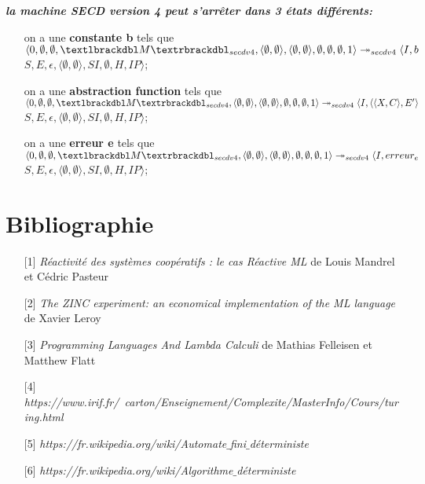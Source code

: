 \documentclass[10pt,a4paper]{article}
\begin{document}
			
			\textbf{\textit{la machine SECD version 4 peut s'arrêter dans 3 états différents:}}
			\smallbreak
			\begin{itemize}
				\item[] on a une \textbf{constante b} tels que $\langle 0,\emptyset,\emptyset,\textlbrackdbl M\textrbrackdbl_{secdv4},\langle\emptyset,\emptyset\rangle,\langle\emptyset,\emptyset\rangle,\emptyset,\emptyset,\emptyset,1\rangle \\
				\twoheadrightarrow_{secdv4} \langle I,b$ $S,E,\epsilon,\langle\emptyset,\emptyset\rangle,SI,\emptyset,H,IP\rangle$;
				\item[] 
				\item[] on a une \textbf{abstraction function} tels que
				$\langle 0,\emptyset,\emptyset,\textlbrackdbl M\textrbrackdbl_{secdv4},\langle\emptyset,\emptyset\rangle,\langle\emptyset,\emptyset\rangle,\emptyset,\emptyset,\emptyset,1\rangle \\
				\twoheadrightarrow_{secdv4} \langle I,\langle\langle X,C\rangle,E'\rangle$ $S,E,\epsilon,\langle\emptyset,\emptyset\rangle,SI,\emptyset,H,IP\rangle$;
				\item[] 
				\item[] on a une \textbf{erreur e} tels que 
				$\langle 0,\emptyset,\emptyset,\textlbrackdbl M\textrbrackdbl_{secdv4},\langle\emptyset,\emptyset\rangle,\langle\emptyset,\emptyset\rangle,\emptyset,\emptyset,\emptyset,1\rangle \\
				\twoheadrightarrow_{secdv4} \langle I,erreur_{e}$ $S,E,\epsilon,\langle\emptyset,\emptyset\rangle,SI,\emptyset,H,IP\rangle$;
			\end{itemize}
		\newpage
		\section{Bibliographie}
			\begin{itemize}
				\item[] [1] \textit{Réactivité des systèmes coopératifs : le cas Réactive ML} de Louis Mandrel et Cédric Pasteur\label{ReactiveML}
				\item[] [2] \textit{The ZINC experiment: an economical implementation of the ML language} de Xavier Leroy\label{ZINC}
				\item[] [3] \textit{Programming Languages And Lambda Calculi} de Mathias Felleisen et Matthew Flatt\label{Calculi}
				\item[] [4] \textit{https://www.irif.fr/~carton/Enseignement/Complexite/MasterInfo/Cours/turing.html}\label{Turing}
				\item[] [5] \textit{https://fr.wikipedia.org/wiki/Automate$\_$fini$\_$déterministe}\label{AFD}
				\item[] [6] \textit{https://fr.wikipedia.org/wiki/Algorithme$\_$déterministe}\label{MFD}
			\end{itemize}
		
\end{document}
